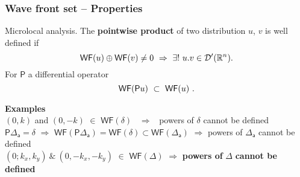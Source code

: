 \documentclass[9pt]{beamer}
\newcommand{\WF}{\mathsf{WF}} %
\newcommand{\Psf}{\mathsf{P}}
\newcommand{\asf}{\mathsf{a}}
\begin{document}
\begin{frame}

\frametitle{Wave front set -- Properties}

\vfill

\begin{block}{Microlocal analysis. }
The \textbf{pointwise product} of two distribution $u$, $v$ is well defined if 
\vspace*{-10pt}
\begin{equation*}
\WF(u) \oplus \WF(v) \neq 0 \ \Rightarrow \ \exists! \ u.v \in \mathcal{D}^{\prime}(\mathbb{R}^n). 
\vspace*{-10pt}
\end{equation*}
For $\Psf$ a differential operator
\vspace*{-12pt}
\begin{equation*}
\WF(\Psf u) \ \subset  \ \WF(u) \ .
\vspace*{-8pt}
\end{equation*}
\end{block}

\vfill

\textbf{Examples} \\[4pt]

$(0,k)$ and $(0,-k)$ $\in$ $\WF(\delta)$ \ $\Rightarrow$ \ powers of $\delta$ cannot be defined \\[3pt]
$\Psf \Delta_\asf = \delta$ $\Rightarrow$ $\WF(\Psf \Delta_\asf) = \WF(\delta) \subset \WF(\Delta_\asf)$ $\Rightarrow$ powers of $\Delta_\asf$ cannot be defined \\[8pt]

$(0;k_x,k_y) \ \& \ (0,-k_x,-k_y)$ $\in$ $\WF(\Delta)$ $\Rightarrow$ \textbf{powers of} $\Delta$ \textbf{cannot be defined} \ \textdbend

\vfill

\end{frame} 

\end{document}
